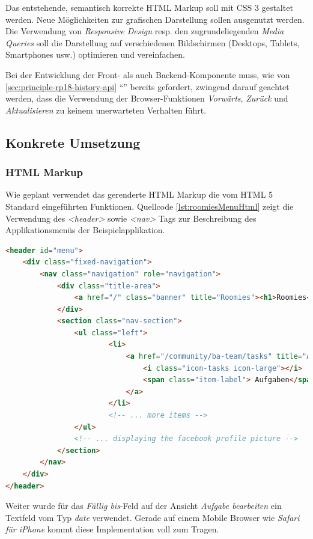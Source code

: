 Das entstehende, semantisch korrekte HTML Markup soll mit CSS 3 gestaltet werden. Neue Möglichkeiten zur grafischen Darstellung sollen ausgenutzt werden. Die Verwendung von \emph{Responsive Design} resp. den zugrundeliegenden \emph{Media Queries} \cite{css-mediaquery} soll die  Darstellung auf verschiedenen Bildschirmen (Desktops, Tablets, Smartphones usw.) optimieren und vereinfachen.

Bei der Entwicklung der Front- als auch Backend-Komponente muss, wie von \ref{sec:principle-rp18-history-api} ``'' bereits gefordert, zwingend darauf geachtet werden, dass die Verwendung der Browser-Funktionen \emph{Vorwärts}, \emph{Zurück} und \emph{Aktualisieren} zu keinem unerwarteten Verhalten führt.

\subsection*{Konkrete Umsetzung}

\subsubsection*{HTML Markup}

Wie geplant verwendet das gerenderte HTML Markup die vom HTML 5 Standard eingeführten Funktionen. Quellcode \ref{lst:roomiesMenuHtml} zeigt die Verwendung des \emph{<header>} sowie \emph{<nav>} Tags zur Beschreibung des Applikationsmenüs der Beispielapplikation.

\begin{lstlisting}[language=HTML, caption={Ausschnitt des gerenderten HTML Markups der Menüleiste \emph{Roomies}}, label={lst:roomiesMenuHtml}]
<header id="menu">
	<div class="fixed-navigation">
		<nav class="navigation" role="navigation">
			<div class="title-area">
				<a href="/" class="banner" title="Roomies"><h1>Roomies</h1></a>
			</div>
			<section class="nav-section">
				<ul class="left">
						<li>
							<a href="/community/ba-team/tasks" title="Aufgaben">
								<i class="icon-tasks icon-large"></i>
								<span class="item-label"> Aufgaben</span>
							</a>
						</li>
						<!-- ... more items -->
				</ul>
				<!-- ... displaying the facebook profile picture -->
			</section>
		</nav>
	</div>
</header>
\end{lstlisting}

Weiter wurde für das \emph{Fällig bis}-Feld auf der Ansicht \emph{Aufgabe bearbeiten} ein Textfeld vom Typ \emph{date} verwendet. Gerade auf einem Mobile Browser wie \emph{Safari für iPhone} kommt diese Implementation voll zum Tragen.

